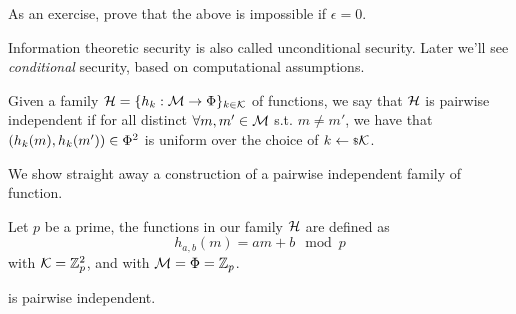 As an exercise, prove that the above is impossible if $\epsilon = 0$.

Information theoretic security is also called unconditional security.
Later we'll see \emph{conditional} security, based on computational assumptions.

\begin{definition}
	Given a family $\mathcal{H} = \{ h_k : \mathcal{M} \to \Phi \}_{k \in \mathcal{K}}$ of functions, we say that $\mathcal{H}$ is pairwise independent if for all distinct $\forall m, m' \in \mathcal{M}$ s.t. $m \neq m'$, we have that $(h_k(m), h_k(m')) \in \Phi^2$ is uniform over the choice of $k \leftarrow {\scriptstyle \$} {\mathcal{K}}$.
\end{definition}

We show straight away a construction of a pairwise independent family of function.
\begin{construction} \label{cons:pairwise-independent}
	Let $p$ be a prime, the functions in our family $\mathcal{H}$ are defined as
	\begin{equation*}
		h_{a,b}(m) = a m + b \mod p
	\end{equation*}
	with $\mathcal{K} = \mathbb{Z}^2_p$, and with $\mathcal{M} = \Phi = \mathbb{Z}_p$.
\end{construction}

\begin{theorem} \label{thm:mod-pairwise-independent}
	 is pairwise independent.
\end{theorem}

